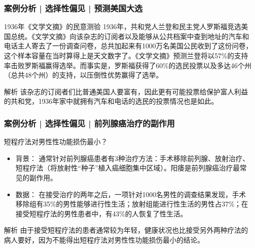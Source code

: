 \begin{frame}
  \frametitle{案例分析 | 选择性偏见 | 预测美国大选}
  \begin{block}{1936年《文学文摘》的民意测验}
    1936年，共和党人兰登和民主党人罗斯福竞选美国总统。《文学文摘》向该杂志的订阅者以及能够从公共档案中查到地址的汽车和电话主人寄去了一份调查问卷，总共加起来有1000万名美国公民收到了这份问卷，这个样本容量在当时算得上是天文数字了。《文学文摘》预测兰登将以57\%的支持率击败罗斯福赢得选举。而事实是，罗斯福获得了60\%的选民投票以及多达46个州（总共48个州）的支持，以压倒性优势赢得了选举。
  \end{block}
  \pause \pause \pause \pause
  \begin{block}{解析}
    该杂志的订阅者们比普通美国人要富有，因此更有可能投票给保护富人利益的共和党，1936年家中就拥有汽车和电话的选民的投票情况也是如此。
  \end{block}
\end{frame}

\begin{frame}
  \frametitle{案例分析 | 选择性偏见 | 前列腺癌治疗的副作用}
  \begin{block}{短程疗法对男性性功能损伤最小？}
    \begin{itemize}
      \item 背景：
通常针对前列腺癌患者有3种治疗方法：手术移除前列腺、放射治疗、短程疗法（将放射性“种子”植入癌细胞集中区域）。阳痿是前列腺癌治疗最常见的副作用。
      \item 数据： 在接受治疗的两年之后，一项针对1000名男性的调查结果发现，手术移除组有35\%的男性能够进行性生活；放射组能进行性生活的男性占37\%；在接受短程疗法的男性患者中，有43\%的人恢复了性生活。
    \end{itemize}
  \end{block}
  \pause \pause \pause \pause
  \begin{block}{解析}
    由于接受短程疗法的患者通常较为年轻，健康状况也比接受另外两种疗法的病人要好，因为不能得出短程疗法对男性性功能损伤最小的结论。
  \end{block}
\end{frame}

